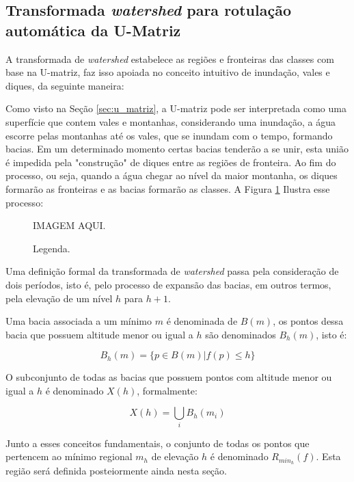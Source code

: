 \subsection{Transformada \textit{watershed} para rotulação automática
da U-Matriz}\label{sec:watershed}

A transformada de \textit{watershed} estabelece as regiões e fronteiras das
classes com base na U-matriz, faz isso apoiada no conceito intuitivo de
inundação, vales e diques, da seguinte maneira:

Como visto na Seção \ref{sec:u_matriz}, a U-matriz pode ser interpretada como
uma superfície que contem vales e montanhas, considerando uma inundação, a água
escorre pelas montanhas até os vales, que se inundam com o tempo, formando
bacias. Em um determinado momento certas bacias tenderão a se unir, esta união
é impedida pela "construção" de diques entre as regiões de fronteira. Ao fim do
processo, ou seja, quando a água chegar ao nível da maior montanha, os diques
formarão as fronteiras e as bacias formarão as classes. A Figura
\ref{fig:tempo_inundacao} Ilustra esse processo:

\begin{figure}[H]
  \begin{center}
    IMAGEM AQUI.
  \end{center}
  \caption{ Legenda. }
  \label{fig:tempo_inundacao}
\end{figure}

Uma definição formal da transformada de \textit{watershed} passa pela
consideração de dois períodos, isto é, pelo processo de expansão das bacias, em
outros termos, pela elevação de um nível $ h $ para $ h + 1 $.

Uma bacia associada a um mínimo $ m $ é denominada de $ B(m) $, os pontos dessa
bacia que possuem altitude menor ou igual a $ h $ são denominados $ B_h(m) $,
isto é:

\begin{equation}\label{eq:watershed_bm}
  B_h(m) = \{ p \in B(m) | f(p) \le h \}
\end{equation}

O subconjunto de todas as bacias que possuem pontos com altitude menor ou igual
a $ h $ é denominado $ X(h) $, formalmente:

\begin{equation}\label{eq:watershed_xh}
  X(h) = \bigcup_i B_h(m_i)
\end{equation}

Junto a esses conceitos fundamentais, o conjunto de todas os pontos que
pertencem ao mínimo regional $ m_h $ de elevação $ h $ é denominado $ R_{min_h}(f)$.
Esta região será definida posteiormente ainda nesta seção.

